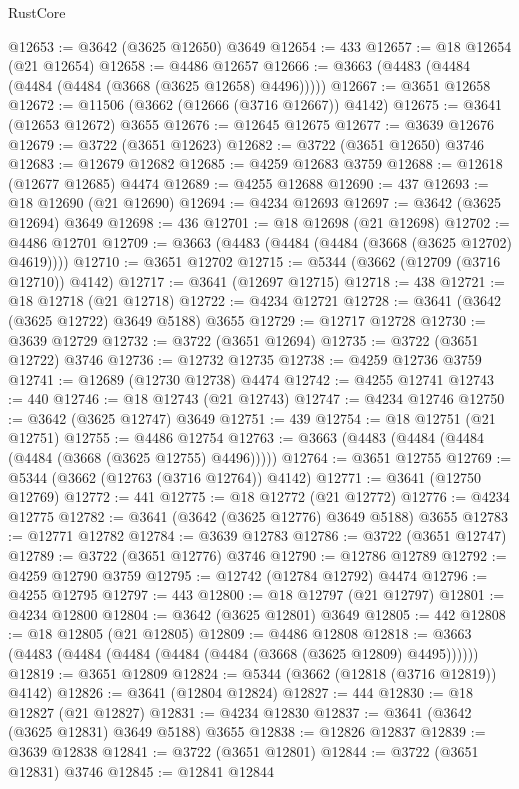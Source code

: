 \begin{lexlean}{RustCore}
\begin{coremodule}
@12653 := @3642 (@3625 @12650) @3649
@12654 := 433
@12657 := @18 @12654 (@21 @12654)
@12658 := @4486 @12657
@12666 := @3663 (@4483 (@4484 (@4484 (@4484 (@3668 (@3625 @12658) @4496)))))
@12667 := @3651 @12658
@12672 := @11506 (@3662 (@12666 (@3716 @12667)) @4142)
@12675 := @3641 (@12653 @12672) @3655
@12676 := @12645 @12675
@12677 := @3639 @12676
@12679 := @3722 (@3651 @12623)
@12682 := @3722 (@3651 @12650) @3746
@12683 := @12679 @12682
@12685 := @4259 @12683 @3759
@12688 := @12618 (@12677 @12685) @4474
@12689 := @4255 @12688
@12690 := 437
@12693 := @18 @12690 (@21 @12690)
@12694 := @4234 @12693
@12697 := @3642 (@3625 @12694) @3649
@12698 := 436
@12701 := @18 @12698 (@21 @12698)
@12702 := @4486 @12701
@12709 := @3663 (@4483 (@4484 (@4484 (@3668 (@3625 @12702) @4619))))
@12710 := @3651 @12702
@12715 := @5344 (@3662 (@12709 (@3716 @12710)) @4142)
@12717 := @3641 (@12697 @12715)
@12718 := 438
@12721 := @18 @12718 (@21 @12718)
@12722 := @4234 @12721
@12728 := @3641 (@3642 (@3625 @12722) @3649 @5188) @3655
@12729 := @12717 @12728
@12730 := @3639 @12729
@12732 := @3722 (@3651 @12694)
@12735 := @3722 (@3651 @12722) @3746
@12736 := @12732 @12735
@12738 := @4259 @12736 @3759
@12741 := @12689 (@12730 @12738) @4474
@12742 := @4255 @12741
@12743 := 440
@12746 := @18 @12743 (@21 @12743)
@12747 := @4234 @12746
@12750 := @3642 (@3625 @12747) @3649
@12751 := 439
@12754 := @18 @12751 (@21 @12751)
@12755 := @4486 @12754
@12763 := @3663 (@4483 (@4484 (@4484 (@4484 (@3668 (@3625 @12755) @4496)))))
@12764 := @3651 @12755
@12769 := @5344 (@3662 (@12763 (@3716 @12764)) @4142)
@12771 := @3641 (@12750 @12769)
@12772 := 441
@12775 := @18 @12772 (@21 @12772)
@12776 := @4234 @12775
@12782 := @3641 (@3642 (@3625 @12776) @3649 @5188) @3655
@12783 := @12771 @12782
@12784 := @3639 @12783
@12786 := @3722 (@3651 @12747)
@12789 := @3722 (@3651 @12776) @3746
@12790 := @12786 @12789
@12792 := @4259 @12790 @3759
@12795 := @12742 (@12784 @12792) @4474
@12796 := @4255 @12795
@12797 := 443
@12800 := @18 @12797 (@21 @12797)
@12801 := @4234 @12800
@12804 := @3642 (@3625 @12801) @3649
@12805 := 442
@12808 := @18 @12805 (@21 @12805)
@12809 := @4486 @12808
@12818 := @3663 (@4483 (@4484 (@4484 (@4484 (@4484 (@3668 (@3625 @12809) @4495))))))
@12819 := @3651 @12809
@12824 := @5344 (@3662 (@12818 (@3716 @12819)) @4142)
@12826 := @3641 (@12804 @12824)
@12827 := 444
@12830 := @18 @12827 (@21 @12827)
@12831 := @4234 @12830
@12837 := @3641 (@3642 (@3625 @12831) @3649 @5188) @3655
@12838 := @12826 @12837
@12839 := @3639 @12838
@12841 := @3722 (@3651 @12801)
@12844 := @3722 (@3651 @12831) @3746
@12845 := @12841 @12844

\end{coremodule}
\end{lexlean}
